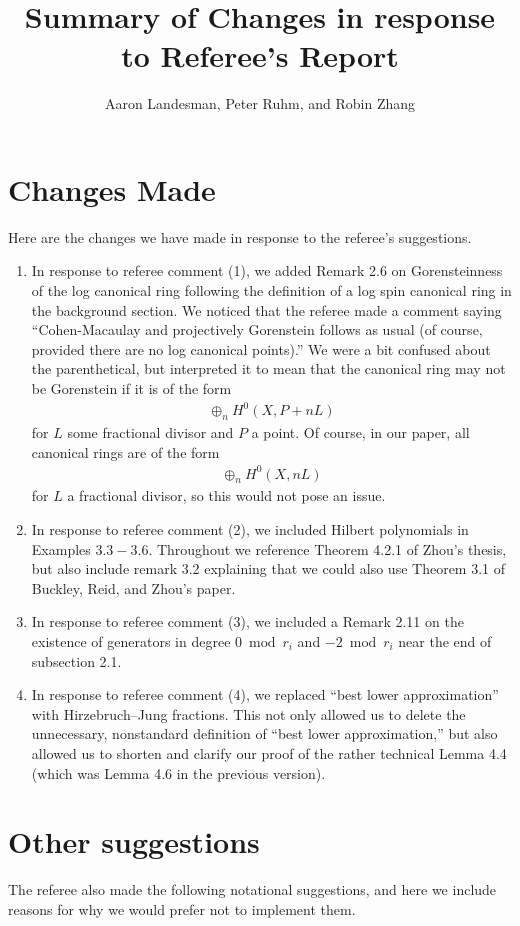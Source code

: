 \documentclass[10 pt]{amsart}
\title{Summary of Changes in response to Referee's Report}
\author{Aaron Landesman, Peter Ruhm, and Robin Zhang}
\theoremstyle{plain}
\theoremstyle{definition}
\theoremstyle{remark}
\numberwithin{equation}{section}
\begin{document}
\maketitle
\section{Changes Made}
Here are the changes we have made in response to the referee's suggestions.

\begin{enumerate}
	\item In response to referee comment (1), we added Remark 2.6 on Gorensteinness of the log canonical ring following
	the definition of a log spin canonical ring in the background section.
	We noticed that the referee made a comment saying
	``Cohen-Macaulay and
projectively Gorenstein follows as usual (of course, provided there are
no log canonical points).'' We were a bit confused about the parenthetical, but interpreted
it to mean that the canonical ring may not be Gorenstein if it is of the form
\begin{align*}
	\oplus_n H^0(X, P + n L)
\end{align*}
for $L$ some fractional divisor and $P$ a point. Of course, in our paper, all canonical rings are of the form
\begin{align*}
	\oplus_n H^0(X, n L)
\end{align*}
for $L$ a fractional divisor, so this would not pose an issue.
	\item In response to referee comment (2), we included Hilbert polynomials in Examples $3.3- 3.6$.
		Throughout we reference Theorem 4.2.1 of Zhou's thesis,
		but also include remark 3.2 explaining that we could also use
		Theorem 3.1 of Buckley, Reid, and Zhou's paper.
	\item In response to referee comment (3), we included a Remark 2.11 on the existence of generators in degree $0 \bmod r_i$
		and $-2 \bmod r_i$ near the end of subsection 2.1.
	\item In response to referee comment (4), we replaced ``best lower approximation'' with Hirzebruch--Jung
		fractions. This not only allowed us to delete the unnecessary, nonstandard definition
		of ``best lower approximation,''
		but also allowed us to shorten and
		clarify our proof of the rather
		technical Lemma 4.4 (which was
		Lemma 4.6 in the previous version).
\end{enumerate}


\section{Other suggestions}
The referee also made the following notational suggestions,
and here we include reasons for why we would prefer not to
implement them.
\end{document}

